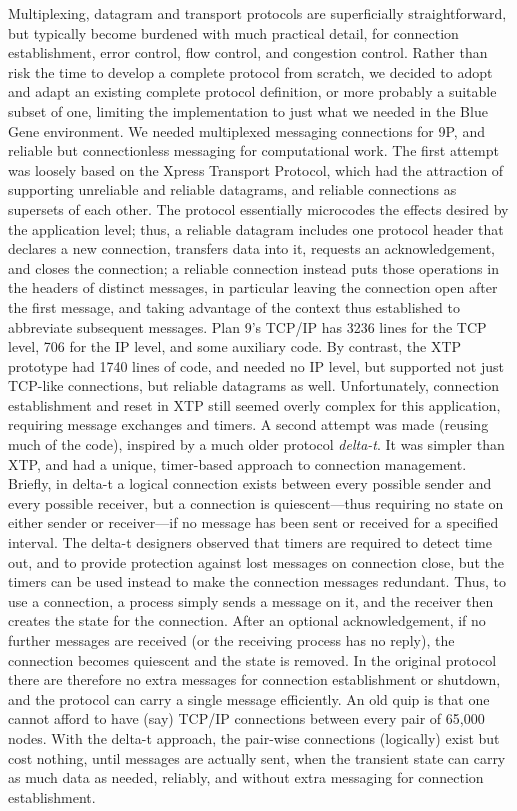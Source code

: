 Multiplexing, datagram and transport protocols are superficially straightforward, but typically become burdened with much practical detail, for connection establishment, error control, flow control, and congestion control. \cite{John-Day-Patterns-of-Network-Archictures}
Rather than risk the time to develop a complete protocol from scratch,
we decided to adopt and adapt an existing complete protocol definition, or more probably a suitable subset of one,
limiting the implementation to just what we needed in the Blue Gene environment.
We needed multiplexed messaging connections for 9P, and reliable but connectionless messaging for computational work.
The first attempt was loosely based on the Xpress Transport Protocol,\cite{xtp}
which had the attraction of supporting unreliable and reliable datagrams, and reliable connections as supersets of each other.
The protocol essentially microcodes the effects desired by the application level;
thus, a reliable datagram includes one protocol header that declares a new connection, transfers data into it, requests an acknowledgement, and closes the connection;
a reliable connection instead puts those operations in the headers of distinct messages, in particular leaving the connection open after the first message, and taking advantage of the context thus established to abbreviate subsequent messages.
Plan 9's TCP/IP has 3236 lines for the TCP level, 706 for the IP level, and some auxiliary code.
By contrast, the XTP prototype had 1740 lines of code, and needed no IP level, but
supported not just TCP-like connections, but reliable datagrams as well.
Unfortunately, connection establishment and reset in XTP still seemed overly complex for this application, requiring message exchanges and timers.
A second attempt was made (reusing much of the code), inspired by a much older protocol \emph{delta-t}.\cite{delta-t}
It was simpler than XTP, and had a unique, timer-based approach to connection management.
Briefly, in delta-t a logical connection exists between every possible sender and every possible receiver, but a connection is quiescent---thus requiring no state on either sender or receiver---if no message has been sent or received for a specified interval.
The delta-t designers observed that timers are required to detect time out, and to provide protection against lost messages on connection close, but the timers can be used instead to make the connection messages redundant.
Thus, to use a connection, a process simply sends a message on it, and the receiver then creates the state for the connection. After an optional acknowledgement, if no further messages are received (or the receiving process has no reply), the connection becomes quiescent and the state is removed. In the original protocol there are therefore no extra messages for connection establishment or shutdown, and the protocol can carry a single message efficiently.
An old quip is that one cannot afford to have (say) TCP/IP connections between every pair of 65,000 nodes.
With the delta-t approach, the pair-wise connections (logically) exist but cost nothing, until messages are actually sent, when the transient state can carry as much data as needed, reliably, and without extra messaging for connection establishment.

